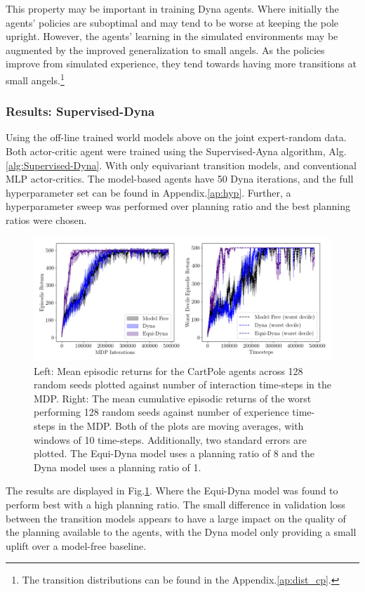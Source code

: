 This property may be important in training Dyna agents. Where initially the agents' policies are suboptimal and may tend to be worse at keeping the pole upright. However, the agents' learning in the simulated environments may be augmented by the improved generalization to small angels. As the policies improve from simulated experience, they tend towards having more transitions at small angels.\footnote{The transition distributions can be found in the Appendix.\ref{ap:dist_cp}.}

\subsubsection{Results: Supervised-Dyna}
Using the off-line trained world models above on the joint expert-random data. Both actor-critic agent were trained using the Supervised-Ayna algorithm, Alg.\ref{alg:Supervised-Dyna}. With only equivariant transition models, and conventional MLP actor-critics. The model-based agents have 50 Dyna iterations, and the full hyperparameter set can be found in Appendix.\ref{ap:hyp}. Further, a hyperparameter sweep was performed over planning ratio and the best planning ratios were chosen.
\begin{figure}
	\centering
	\includegraphics[width=\textwidth]{Figures/Expert_dyna_cp_best.png}
	\caption{Left: Mean episodic returns for the CartPole agents across 128 random seeds
		plotted against number of interaction time-steps in the MDP. Right: The mean
		cumulative episodic returns of the worst performing 128 random seeds against
		number of experience time-steps in the MDP. Both of the plots are moving
		averages, with windows of 10 time-steps. Additionally, two standard errors are
		plotted. The Equi-Dyna model uses a planning ratio of 8 and the Dyna model uses a planning ratio of 1.}
	\label{fig:sup-dyna-cp}
\end{figure}
The results are displayed in Fig.\ref{fig:sup-dyna-cp}. Where the Equi-Dyna model was found to perform best with a high planning ratio. The small difference in validation loss between the transition models appears to have a large impact on the quality of the planning available to the agents, with the Dyna model only providing a small uplift over a model-free baseline.
